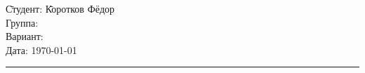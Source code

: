 \begin{tabbing}
	\hspace{11cm} \= Студент: \= Коротков Фёдор \\ %
	\> Группа:  \\  %
	\> Вариант:  \\    %
	\> Дата: \> \today     %
\end{tabbing}
\hrule
\vspace{1cm}